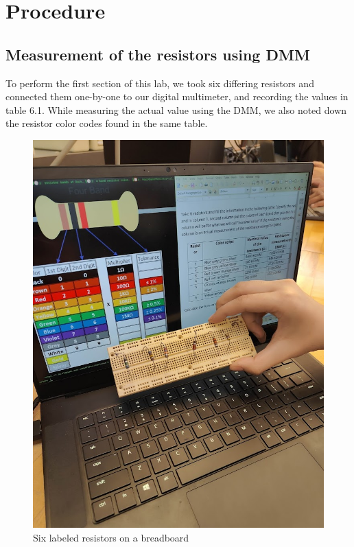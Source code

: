 \documentclass[titlepage]{article}
\begin{document}
	\section{Procedure}
        \subsection{Measurement of the resistors using DMM}
        To perform the first section of this lab, we took six differing resistors and connected them one-by-one to our digital multimeter, and recording the values in table 6.1. While measuring the actual value using the DMM, we also noted down the resistor color codes found in the same table.

        \begin{figure}[hbt!]
                \centering
                \caption{Six labeled resistors on a breadboard}
                \includegraphics[scale=0.2]{procedure/unknownresistors}
            \end{figure} 
\end{document}

